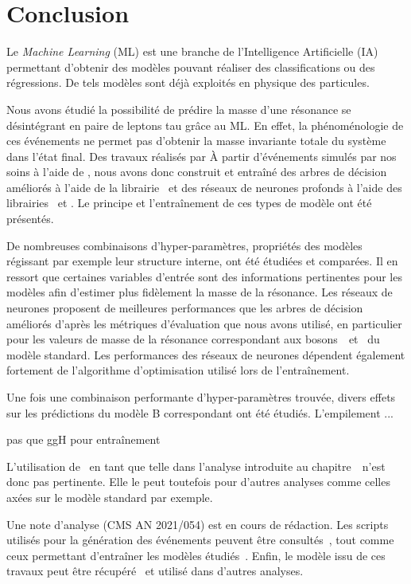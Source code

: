\section{Conclusion}\label{chapter-ML-section-conclusion}
Le \emph{Machine Learning} (ML) est une branche de l'Intelligence Artificielle (IA)
permettant d'obtenir des modèles pouvant réaliser des classifications ou des régressions.
De tels modèles sont déjà exploités en physique des particules.
\par
Nous avons étudié la possibilité de prédire la masse d'une résonance se désintégrant en paire de leptons tau grâce au ML.
En effet, la phénoménologie de ces événements ne permet pas d'obtenir la masse invariante totale du système dans l'état final.
Des travaux réalisés par 
À partir d'événements simulés par nos soins à l'aide de \FASTSIM,
nous avons donc construit et entraîné
des arbres de décision améliorés à l'aide de la librairie \XGBOOST\
et
des réseaux de neurones profonds à l'aide des librairies \KERAS\ et \TENSORFLOW.
Le principe et l'entraînement de ces types de modèle ont été présentés.
\par
De nombreuses combinaisons d'hyper-paramètres,
propriétés des modèles régissant par exemple leur structure interne,
ont été étudiées et comparées.
Il en ressort que certaines variables d'entrée sont des informations pertinentes pour les modèles
afin d'estimer plus fidèlement la masse de la résonance.
Les réseaux de neurones
proposent de meilleures performances que
les arbres de décision améliorés
d'après les métriques d'évaluation que nous avons utilisé,
en particulier pour les valeurs de masse de la résonance correspondant aux bosons~\Zboson\ et \higgs\ du modèle standard.
Les performances des réseaux de neurones dépendent également fortement de l'algorithme d'optimisation utilisé lors de l'entraînement.
\par
Une fois une combinaison performante d'hyper-paramètres trouvée,
divers effets sur les prédictions du modèle B correspondant ont été étudiés.
L'empilement ... \todo{continue here}




pas que ggH pour entraînement

L'utilisation de \mml\ en tant que telle dans l'analyse introduite au chapitre~\ n'est donc pas pertinente.
Elle le peut toutefois pour d'autres analyses comme celles axées sur le modèle standard par exemple.


Une note d'analyse (CMS AN 2021/054) \cite{CMS-NOTE-2021-054} est en cours de rédaction.
Les scripts utilisés pour la génération des événements peuvent être consultés~\cite{fastsim_ece},
tout comme ceux permettant d'entraîner les modèles étudiés~\cite{DL_for_HTT_mass}.
Enfin, le modèle issu de ces travaux peut être récupéré~\cite{DiTau_ML_mass} et utilisé dans d'autres analyses.